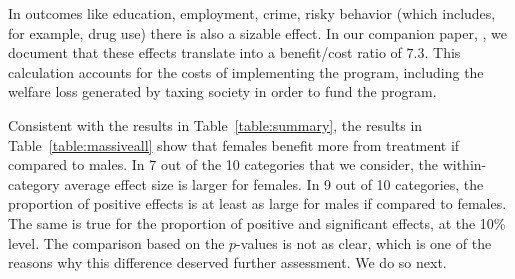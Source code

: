 In outcomes like education, employment, crime, risky behavior (which includes, for example, drug use) there is also a sizable effect. In our companion paper, \citet{Garcia_Heckman_Leaf_etal_2017_Comp_CBA_Unpublished}, we document that these effects translate into a benefit/cost ratio of $7.3$. This calculation accounts for the costs of implementing the program, including the welfare loss generated by taxing society in order to fund the program.

Consistent with the results in Table~\ref{table:summary}, the results in Table~\ref{table:massiveall} show that females benefit more from treatment if compared to males. In 7 out of the 10 categories that we consider, the within-category average effect size is larger for females. In 9 out of 10 categories, the proportion of positive effects is at least as large for males if compared to females. The same is true for the proportion of positive and significant effects, at the 10\% level. The comparison based on the \citet{Rosenbaum_2005_Distribution_JRSS} $p$-values is not as clear, which is one of the reasons why this difference deserved further assessment. We do so next.


